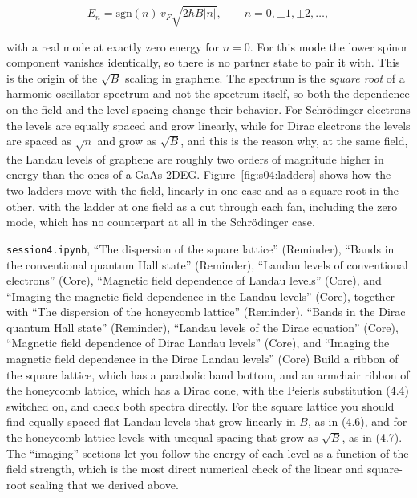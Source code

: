 \begin{equation}
E_n = \text{sgn}(n)\, v_F\sqrt{2\hbar B|n|}, \qquad n = 0,\pm1,\pm2,\dots,
\end{equation}

with a real mode at exactly zero energy for $n=0$. For this mode the lower spinor component
vanishes identically, so there is no partner state to pair it with. This is the origin of the
$\sqrt{B}$ scaling in graphene. The spectrum is the \emph{square root} of a harmonic-oscillator
spectrum and not the spectrum itself, so both the dependence on the field and the level spacing
change their behavior. For Schrödinger electrons the levels are equally spaced and grow linearly,
while for Dirac electrons the levels are spaced as $\sqrt{n}$ and grow as $\sqrt{B}$, and this is
the reason why, at the same field, the Landau levels of graphene are roughly two orders of
magnitude higher in energy than the ones of a GaAs 2DEG. Figure~\ref{fig:s04:ladders} shows how the
two ladders move with the field, linearly in one case and as a square root in the other, with the
ladder at one field as a cut through each fan, including the zero mode, which has no counterpart at
all in the Schrödinger case.



\begin{notebookbox}{\texttt{session4.ipynb}, ``The dispersion of the square lattice'' (Reminder), ``Bands in the conventional quantum Hall state'' (Reminder), ``Landau levels of conventional electrons'' (Core), ``Magnetic field dependence of Landau levels'' (Core), and ``Imaging the magnetic field dependence in the Landau levels'' (Core), together with ``The dispersion of the honeycomb lattice'' (Reminder), ``Bands in the Dirac quantum Hall state'' (Reminder), ``Landau levels of the Dirac equation'' (Core), ``Magnetic field dependence of Dirac Landau levels'' (Core), and ``Imaging the magnetic field dependence in the Dirac Landau levels'' (Core)}
Build a ribbon of the square lattice, which has a parabolic band bottom, and an armchair ribbon of
the honeycomb lattice, which has a Dirac cone, with the Peierls substitution (4.4) switched on, and
check both spectra directly. For the square lattice you should find equally spaced flat Landau
levels that grow linearly in $B$, as in (4.6), and for the honeycomb lattice levels with unequal
spacing that grow as $\sqrt{B}$, as in (4.7). The ``imaging'' sections let you follow the energy
of each level as a function of the field strength, which is the most direct numerical check of the
linear and square-root scaling that we derived above.
\end{notebookbox}

